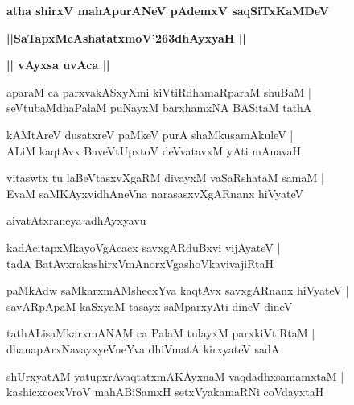 \documentclass[twoside,12pt,openright]{book}
\def\S{\char'263}
\newcounter{shloka}[chapter]
\def\uvaca#1{\centerline{{\large\textbf{#1}}}}
\begin{document}
\begin{center}
{\LARGE\bfseries atha shirxV mahApurANeV pAdemxV saqSiTxKaMDeV}
\end{center}

\begin{center}
{\LARGE\bfseries ||SaTapxMcAshatatxmoV\S dhAyxyaH || }
\end{center}

\uvaca{|| vAyxsa uvAca ||}

\begin{shloka}%
aparaM ca parxvakASxyXmi kiVtiRdhamaRparaM shuBaM |\\
seVtubaMdhaPalaM puNayxM barxhamxNA BASitaM tathA 
\end{shloka}

\begin{shloka}%
kAMtAreV dusatxreV paMkeV purA shaMkusamAkuleV |\\
ALiM kaqtAvx BaveVtUpxtoV deVvatavxM yAti mAnavaH 
\end{shloka}

\begin{shloka}%
vitaswtx tu laBeVtasxvXgaRM divayxM vaSaRshataM samaM |\\
EvaM saMKAyxvidhAneVna narasasxvXgARnanx hiVyateV 
\end{shloka}

\begin{center}
aivatAtxraneya adhAyxyavu
\end{center}

\begin{shloka}%
kadAcitapxMkayoVgAcacx savxgARduBxvi vijAyateV |\\
tadA BatAvxrakashirxVmAnorxVgashoVkavivajiRtaH 
\end{shloka}

\begin{shloka}%
paMkAdw saMkarxmAMshecxYva kaqtAvx savxgARnanx hiVyateV |\\
savARpApaM kaSxyaM tasayx saMparxyAti dineV dineV 
\end{shloka}

\begin{shloka}%
tathALisaMkarxmANAM ca PalaM tulayxM parxkiVtiRtaM |\\
dhanapArxNavayxyeVneYva dhiVmatA kirxyateV sadA 
\end{shloka}

\begin{shloka}%
shUrxyatAM yatupxrAvaqtatxmAKAyxnaM vaqdadhxsamamxtaM |\\
kashicxcocxVroV mahABiSamxH setxVyakamaRNi coVdayxtaH 
\end{shloka}
\end{document}
